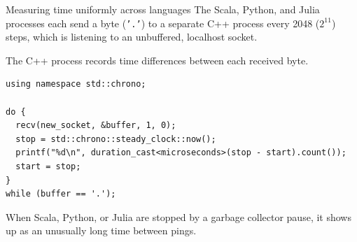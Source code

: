 \documentclass[aspectratio=169]{beamer}
\begin{document}
\begin{frame}[fragile]{Measuring time uniformly across languages}
\vspace{0.3 cm}
The Scala, Python, and Julia processes each send a byte (\texttt{'.'}) to a separate C++ process every 2048 ($2^{11}$) steps, which is listening to an unbuffered, localhost socket.

\vspace{0.2 cm}
The C++ process records time differences between each received byte.

\small
\vspace{0.3 cm}
\begin{verbatim}
using namespace std::chrono;

do {
  recv(new_socket, &buffer, 1, 0);
  stop = std::chrono::steady_clock::now();
  printf("%d\n", duration_cast<microseconds>(stop - start).count());
  start = stop;
}
while (buffer == '.');
\end{verbatim}

\normalsize
\vspace{0.3 cm}
When Scala, Python, or Julia are stopped by a garbage collector pause, it shows up as an unusually long time between pings.
\end{frame}
\end{document}
